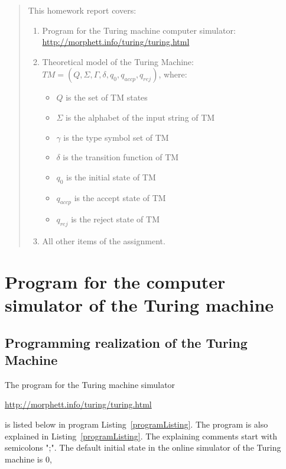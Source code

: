 \documentclass[12pt, a4paper]{report}
\begin{document}
\newpage
\markboth{}{}
\vspace{-15cm}
\begin{abstract}
	This homework report covers:
	\begin{enumerate}
		\item Program for the Turing machine computer simulator: \url{http://morphett.info/turing/turing.html}
		\item Theoretical model of the Turing Machine: $ TM = (Q, \Sigma, \Gamma, \delta, q_{0}, q_{accp}, q_{rej}) $, 
		where: 
			\begin{itemize}
				\item $Q$  is the set of TM states
				\item $\Sigma$  is the alphabet of the input string of TM
				\item $\gamma$  is the type symbol set of TM
				\item $\delta$  is the transition function of TM
				\item $q_{0}$ is the initial state of TM
				\item $q_{accp}$ is the accept state of TM
				\item $q_{rej}$  is the reject state of TM
				\end{itemize}
		\item All other items of the assignment.
		\end{enumerate}

	\end{abstract}
\newpage

\tableofcontents
{}


\newpage
\chapter{Program for the computer simulator of the Turing machine}
\section[]{Programming realization of the Turing Machine}

The program for the Turing machine simulator \cite{TuringSite} \vspace{-0.25cm}
{\center \url{http://morphett.info/turing/turing.html} \par}
\noindent
is listed below in program Listing~\ref{programListing}.
The program is also explained in Listing~\ref{programListing}. The explaining comments start with semicolons ";".
The default initial state in the online simulator of the Turing machine \cite{TuringSite} is $ 0 $,
\end{document}
